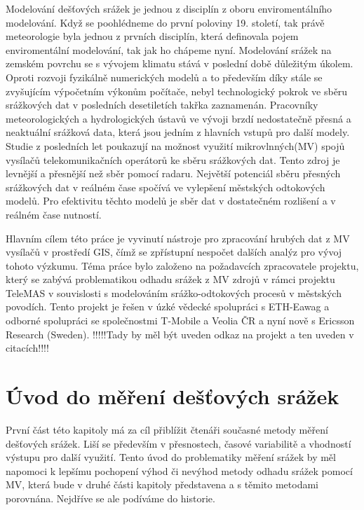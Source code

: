 \documentclass[a4paper,12pt]{article}
\begin{document}
Modelování dešťových srážek je jednou z disciplín z oboru enviromentálního modelování. Když se poohlédneme do první poloviny 19. století, tak právě meteorologie byla jednou z prvních disciplín, která definovala pojem enviromentální modelování, tak jak ho chápeme nyní. Modelování srážek na zemském povrchu se s vývojem klimatu stává v poslední době důležitým úkolem. Oproti rozvoji fyzikálně numerických modelů a to především díky stále se zvyšujícím výpočetním výkonům počítače, nebyl technologický pokrok ve sběru srážkových dat v posledních desetiletích takřka zaznamenán. Pracovníky meteorologických a hydrologických ústavů ve vývoji brzdí nedostatečně přesná a neaktuální srážková data, která jsou jedním z hlavních vstupů pro další modely. Studie z posledních let poukazují na možnost využití mikrovlnných(MV) spojů vysílačů telekomunikačních operátorů ke sběru srážkových dat. Tento zdroj je levnější a přesnější než sběr pomocí radaru.\cite{radar_meterology} Největší potenciál sběru přesných srážkových dat v reálném čase spočívá ve vylepšení městských odtokových modelů. Pro efektivitu těchto modelů je sběr dat v dostatečném rozlišení a v reálném čase nutností.

Hlavním cílem této práce je vyvinutí nástroje pro zpracování hrubých dat z MV vysílačů v prostředí GIS, čímž se zpřístupní nespočet dalších analýz pro vývoj tohoto výzkumu. Téma práce bylo založeno na požadavcích zpracovatele projektu, který se zabývá problematikou odhadu srážek z MV zdrojů v rámci projektu TeleMAS v souvislosti s modelováním srážko-odtokových procesů v městských povodích. Tento projekt je řešen v úzké vědecké spolupráci s ETH-Eawag a odborné spolupráci se společnostmi T-Mobile a Veolia ČR a nyní nově s Ericsson Research (Sweden).  !!!!!Tady by měl být uveden odkaz na projekt a ten uveden v citacích!!!!

 





\section{Úvod do měření dešťových srážek}
První část této kapitoly má za cíl přiblížit čtenáři současné metody měření dešťových srážek. Liší se především v přesnostech, časové variabilitě a vhodností výstupu pro další využití. Tento úvod do problematiky měření srážek by měl napomoci k lepšímu pochopení výhod či nevýhod metody odhadu srážek pomocí MV, která bude v druhé části kapitoly představena a s těmito metodami porovnána. Nejdříve se ale podíváme do historie.
\end{document}

